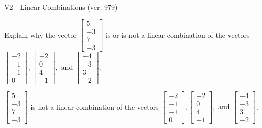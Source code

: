 \begin{exercise}
  \begin{exerciseTitle}V2 - Linear Combinations (ver. 979)\end{exerciseTitle}
  \begin{exerciseStatement}
    Explain why the vector \(\left[\begin{array}{c}
5 \\
-3 \\
7 \\
-3
\end{array}\right]\)  is or is not a linear 
	combination of the vectors \(\left[\begin{array}{c}
-2 \\
-1 \\
-1 \\
0
\end{array}\right] , \left[\begin{array}{c}
-2 \\
0 \\
4 \\
-1
\end{array}\right] , \text{ and } \left[\begin{array}{c}
-4 \\
-3 \\
3 \\
-2
\end{array}\right]\).
	


  \end{exerciseStatement}
  \begin{exerciseAnswer}
   \(\left[\begin{array}{c}
5 \\
-3 \\
7 \\
-3
\end{array}\right]\) 
  	 is not  
	a linear combination of the vectors \(\left[\begin{array}{c}
-2 \\
-1 \\
-1 \\
0
\end{array}\right] , \left[\begin{array}{c}
-2 \\
0 \\
4 \\
-1
\end{array}\right] , \text{ and } \left[\begin{array}{c}
-4 \\
-3 \\
3 \\
-2
\end{array}\right]\).

	
  


  \end{exerciseAnswer}
\end{exercise}